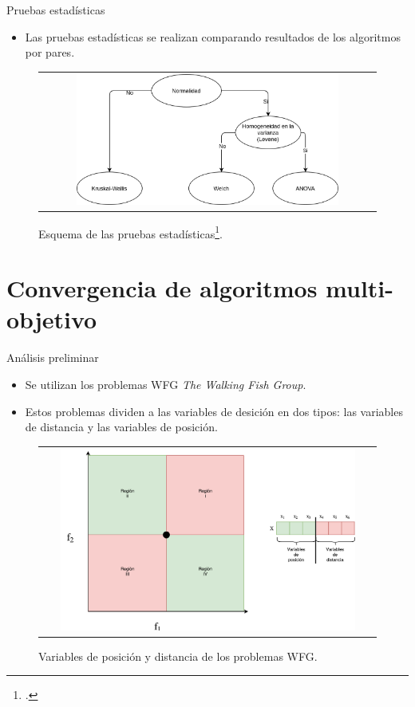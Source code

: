 \documentclass{beamer}
\begin{document}
\begin{frame}{Pruebas estadísticas}
\begin{itemize}
\item Las pruebas estadísticas se realizan comparando resultados de los algoritmos por pares.
\end{itemize}
\begin{figure}[H]
\begin{tabular}{c}
\includegraphics[width=0.8\textwidth]{Images/Tests.png}
\end{tabular}
\centering
\caption{\scriptsize Esquema de las pruebas estadísticas\footcite{Joel:StatisticalTest}.}
\end{figure}

\end{frame}


\section{Convergencia de algoritmos multi-objetivo}


\begin{frame}{Análisis preliminar}
\begin{itemize}
\scriptsize
\justifying
\item Se utilizan los problemas WFG \textit{The Walking Fish Group}.
\justifying
\item Estos problemas dividen a las variables de desición en dos tipos: las variables de distancia y las variables de posición.
\end{itemize}
\begin{figure}
\centering
\begin{tabular}{c}
 \includegraphics[width=0.9\textwidth]{Images/Parametros_Posicion_Distancia.pdf}   \\
\end{tabular}
\caption{Variables de posición y distancia de los problemas WFG.}
\end{figure}
\end{frame}
\end{document}
